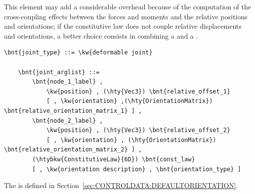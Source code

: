 \noindent
This element may add a considerable overhead because of the computation
of the cross-coupling effects between the forces and moments and the
relative positions and orientations; if the constitutive law does not couple
relative displacements and orientations, a better choice consists 
in combining a  and a .
\begin{Verbatim}[commandchars=\\\{\}]
    \bnt{joint_type} ::= \kw{deformable joint}

    \bnt{joint_arglist} ::= 
        \bnt{node_1_label} ,
            \kw{position} , (\hty{Vec3}) \bnt{relative_offset_1}
            [ , \kw{orientation} ,(\hty{OrientationMatrix}) \bnt{relative_orientation_matrix_1} ] ,
        \bnt{node_2_label} ,
            \kw{position} , (\hty{Vec3}) \bnt{relative_offset_2}
            [ , \kw{orientation} , (\hty{OrientationMatrix}) \bnt{relative_orientation_matrix_2} ] ,
        (\htybkw{ConstitutiveLaw}{6D}) \bnt{const_law}
        [ , \kw{orientation description} , \bnt{orientation_type} ]
\end{Verbatim}
The  is defined
in Section~\ref{sec:CONTROLDATA:DEFAULTORIENTATION}.

